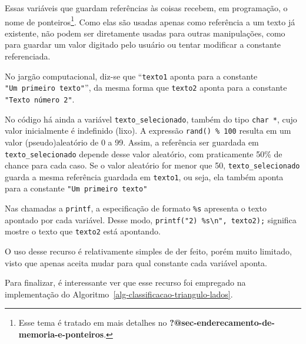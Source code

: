 \documentclass[
  letterpaper,
  DIV=11,
  numbers=noendperiod]{scrartcl}
\begin{document}
Essas variáveis que guardam referências às coisas recebem, em
programação, o nome de ponteiros\footnote{Esse tema é tratado em mais
  detalhes no \textbf{?@sec-enderecamento-de-memoria-e-ponteiros}.}.
Como elas são usadas apenas como referência a um texto já existente, não
podem ser diretamente usadas para outras manipulações, como para guardar
um valor digitado pelo usuário ou tentar modificar a constante
referenciada.

No jargão computacional, diz-se que ``\texttt{texto1} aponta para a
constante \texttt{"Um\ primeiro\ texto"}'', da mesma forma que
\texttt{texto2} aponta para a constante \texttt{"Texto\ número\ 2"}.

No código há ainda a variável \texttt{texto\_selecionado}, também do
tipo \texttt{char\ *}, cujo valor inicialmente é indefinido (lixo). A
expressão \texttt{rand()\ \%\ 100} resulta em um valor (pseudo)aleatório
de 0 a 99. Assim, a referência ser guardada em
\texttt{texto\_selecionado} depende desse valor aleatório, com
praticamente 50\% de chance para cada caso. Se o valor aleatório for
menor que 50, \texttt{texto\_selecionado} guarda a mesma referência
guardada em \texttt{texto1}, ou seja, ela também aponta para a constante
\texttt{"Um\ primeiro\ texto"}

Nas chamadas a \texttt{printf}, a especificação de formato \texttt{\%s}
apresenta o texto apontado por cada variável. Desse modo,
\texttt{printf("2)\ \%s\textbackslash{}n",\ texto2);} significa mostre o
texto que \texttt{texto2} está apontando.

O uso desse recurso é relativamente simples de der feito, porém muito
limitado, visto que apenas aceita mudar para qual constante cada
variável aponta.

Para finalizar, é interessante ver que esse recurso foi empregado na
implementação do Algoritmo~\ref{alg-classificacao-triangulo-lados}.
\end{document}
